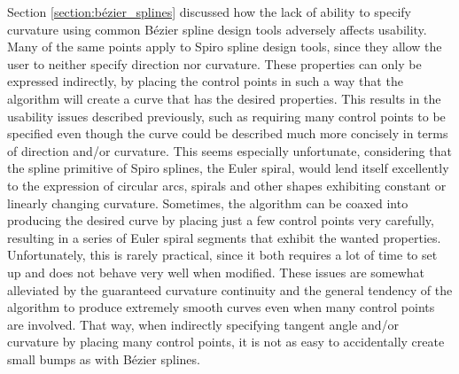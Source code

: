 \documentclass[a4paper]{article}
\begin{document}
				Section \ref{section:bézier_splines} discussed how the lack of ability to specify curvature using common Bézier spline design tools adversely affects usability. Many of the same points apply to Spiro spline design tools, since they allow the user to neither specify direction nor curvature. These properties can only be expressed indirectly, by placing the control points in such a way that the algorithm will create a curve that has the desired properties. This results in the usability issues described previously, such as requiring many control points to be specified even though the curve could be described much more concisely in terms of direction and/or curvature. This seems especially unfortunate, considering that the spline primitive of Spiro splines, the Euler spiral, would lend itself excellently to the expression of circular arcs, spirals and other shapes exhibiting constant or linearly changing curvature. Sometimes, the algorithm can be coaxed into producing the desired curve by placing just a few control points very carefully, resulting in a series of Euler spiral segments that exhibit the wanted properties. Unfortunately, this is rarely practical, since it both requires a lot of time to set up and does not behave very well when modified. These issues are somewhat alleviated by the guaranteed curvature continuity and the general tendency of the algorithm to produce extremely smooth curves even when many control points are involved. That way, when indirectly specifying tangent angle and/or curvature by placing many control points, it is not as easy to accidentally create small bumps as with Bézier splines.
\end{document}
